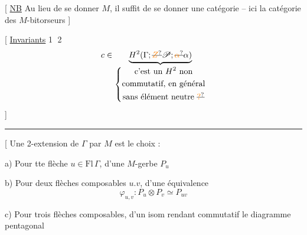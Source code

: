 [ \uline{NB} Au lieu de se donner $M$, il suffit de se donner
une catégorie   -- ici la catégorie des
$M$-bitorseurs ]

[ \uline{Invariants} \textcircled{1}
\textcircled{2}
\[
c\in\underbrace{H^2(\Gamma;\deleted{\unsure{Z}}\mathscr P;\deleted{\unsure{\alpha}}\alpha)}_{
\left\{\begin{gathered}\text{c'est un }H^{2}\text{ non}\\
\text{commutatif, en général}\\
\text{sans élément neutre }\deleted{\unsure{?}}\end{gathered}\right.}
\]
]

\noindent\rule{.4\linewidth}{.4pt}

[ Une 2-extension de $\Gamma$ par $M$  est le choix :

a) Pour tte flèche $u\in\mathrm{Fl}\,\Gamma$, d'une $M$-gerbe $P_u$

b) Pour deux flèches composables $u.v$, d'une
équivalence
\[
\varphi_{u,v}:P_u\otimes P_v\simeq P_{uv}
\]

c) Pour trois flèches composables, d'un isom
rendant commutatif le diagramme
pentagonal


